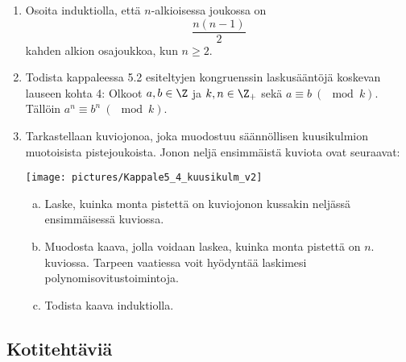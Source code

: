\begin{enumerate}
\item
Osoita induktiolla, että $n$-alkioisessa joukossa on
\[
\frac{n(n-1)}{2}
\]
kahden alkion osajoukkoa, kun $n \ge 2$.

\item Todista kappaleessa 5.2 esiteltyjen kongruenssin laskusääntöjä koskevan lauseen kohta 4: Olkoot $a, b \in \Z$ ja $k,n \in \Z_+$ sekä $a \equiv b\ (\mod k)$. Tällöin $a^n \equiv b^n\ (\mod k)$.

\item Tarkastellaan kuviojonoa, joka muodostuu säännöllisen kuusikulmion muotoisista pistejoukoista. Jonon neljä ensimmäistä kuviota ovat seuraavat:

\begin{center}
\texttt{[image: pictures/Kappale5\_4\_kuusikulm\_v2]}
\end{center}


\begin{enumerate}[a)]
\item Laske, kuinka monta pistettä on kuviojonon kussakin neljässä ensimmäisessä kuviossa.
\item Muodosta kaava, jolla voidaan laskea, kuinka monta pistettä on $n$. kuviossa. Tarpeen vaatiessa voit hyödyntää laskimesi polynomisovitustoimintoja.
\item Todista kaava induktiolla.
\end{enumerate}

\end{enumerate}

\subsection*{Kotitehtäviä}

